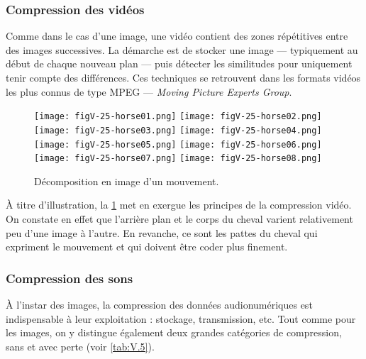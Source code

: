 \subsubsection[Vidéos]{Compression des vidéos}
\label{subsub:V.3.1.3}

Comme dans le cas d'une image, une vidéo contient des zones répétitives entre des images successives. La démarche est de stocker une image --- typiquement au début de chaque nouveau plan --- puis détecter les similitudes pour uniquement tenir compte des différences.
Ces techniques se retrouvent dans les formats vidéos les plus connus de type MPEG --- \textit{Moving Picture Experts Group}.

\begin{figure}
\texttt{[image: figV-25-horse01.png]}%
\texttt{[image: figV-25-horse02.png]}%
\texttt{[image: figV-25-horse03.png]}%
\texttt{[image: figV-25-horse04.png]}\\
\texttt{[image: figV-25-horse05.png]}%
\texttt{[image: figV-25-horse06.png]}%
\texttt{[image: figV-25-horse07.png]}%
\texttt{[image: figV-25-horse08.png]}%
\caption{\label{fig:V.25}Décomposition en image d'un mouvement.}
\end{figure}

À titre d'illustration, la \cref{fig:V.25} met en exergue les principes de la compression vidéo. On constate en effet que l'arrière plan et le corps du cheval varient relativement peu d'une image à l'autre. En revanche, ce sont les pattes du cheval qui expriment le mouvement et qui doivent être coder plus finement.


\subsubsection[Sons]{Compression des sons}
\label{subsub:V.3.1.4}

À l'instar des images, la compression des données audionumériques est indispensable à leur exploitation : stockage, transmission, etc. Tout comme pour les images, on y distingue également deux grandes catégories de compression, sans et avec perte (voir \cref{tab:V.5}).

